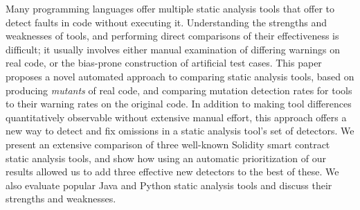 Many programming languages offer multiple static analysis tools that offer to detect faults in code without executing it.  Understanding the strengths and weaknesses of tools, and performing direct comparisons of their effectiveness is difficult; it usually involves either manual examination of differing warnings on real code, or the bias-prone construction of artificial test cases.
This paper proposes a novel automated approach to comparing static analysis tools, based on producing \emph{mutants} of real code, and comparing mutation detection rates for tools to their warning rates on the original code.  In addition to making tool differences quantitatively observable without extensive manual effort, this approach offers a new way to detect and fix omissions in a static analysis tool's set of detectors.  We present an extensive comparison of three well-known Solidity smart contract static analysis tools, and show how using an automatic prioritization of our results allowed us to add three effective new detectors to the best of these.  We also evaluate popular Java and Python static analysis tools and discuss their strengths and weaknesses.